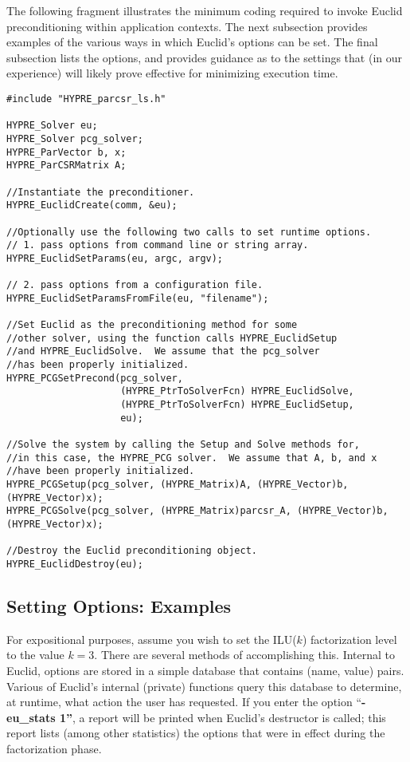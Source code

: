 The following fragment illustrates the minimum coding %
required to invoke Euclid preconditioning within \hypre{} application contexts.
The next subsection provides examples of the various ways in which
Euclid's options can be set. 
The final subsection lists the options,
and provides guidance as to the settings that (in our experience) 
will likely prove effective for minimizing execution time.

\begin{display}
\begin{verbatim}
#include "HYPRE_parcsr_ls.h"

HYPRE_Solver eu;
HYPRE_Solver pcg_solver;
HYPRE_ParVector b, x;
HYPRE_ParCSRMatrix A;

//Instantiate the preconditioner.
HYPRE_EuclidCreate(comm, &eu);

//Optionally use the following two calls to set runtime options.
// 1. pass options from command line or string array.
HYPRE_EuclidSetParams(eu, argc, argv);

// 2. pass options from a configuration file.
HYPRE_EuclidSetParamsFromFile(eu, "filename");

//Set Euclid as the preconditioning method for some
//other solver, using the function calls HYPRE_EuclidSetup
//and HYPRE_EuclidSolve.  We assume that the pcg_solver
//has been properly initialized.
HYPRE_PCGSetPrecond(pcg_solver,
                    (HYPRE_PtrToSolverFcn) HYPRE_EuclidSolve,
                    (HYPRE_PtrToSolverFcn) HYPRE_EuclidSetup,
                    eu);

//Solve the system by calling the Setup and Solve methods for, 
//in this case, the HYPRE_PCG solver.  We assume that A, b, and x
//have been properly initialized.
HYPRE_PCGSetup(pcg_solver, (HYPRE_Matrix)A, (HYPRE_Vector)b, (HYPRE_Vector)x);
HYPRE_PCGSolve(pcg_solver, (HYPRE_Matrix)parcsr_A, (HYPRE_Vector)b, (HYPRE_Vector)x);

//Destroy the Euclid preconditioning object.
HYPRE_EuclidDestroy(eu);

\end{verbatim}
\end{display}


\subsection{Setting Options: Examples}

For expositional purposes, assume you wish to set the ILU($k$)
factorization level to the value $k = 3$.
There are several methods of accomplishing this.
Internal to Euclid, options are stored in a simple database that
contains (name, value) pairs.
Various of Euclid's internal (private) functions query this
database to determine, at runtime, what action the user
has requested.
If you enter the option ``{\bf -eu\_stats 1''}, a report will
be printed when Euclid's destructor is called; this
report lists (among other statistics) the options that
were in effect during the factorization phase.

